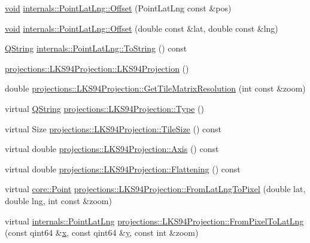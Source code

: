 \begin{DoxyCompactItemize}
\hyperlink{group___u_a_v_objects_plugin_ga444cf2ff3f0ecbe028adce838d373f5c}{void} \hyperlink{group___o_p_map_widget_ga3ad4201693b6e3add6b7ad1b9ff2e473}{internals\-::\-Point\-Lat\-Lng\-::\-Offset} (\-Point\-Lat\-Lng const \&pos)
\item 
\hyperlink{group___u_a_v_objects_plugin_ga444cf2ff3f0ecbe028adce838d373f5c}{void} \hyperlink{group___o_p_map_widget_ga41a2477cd6dbc4af991b30ddc2fc03c2}{internals\-::\-Point\-Lat\-Lng\-::\-Offset} (double const \&lat, double const \&lng)
\item 
\hyperlink{group___u_a_v_objects_plugin_gab9d252f49c333c94a72f97ce3105a32d}{\-Q\-String} \hyperlink{group___o_p_map_widget_gad6aaf34436258a8288cae1d93e13ad07}{internals\-::\-Point\-Lat\-Lng\-::\-To\-String} () const 
\item 
\hyperlink{group___o_p_map_widget_gacf511403f6a470bec942524c0e020b77}{projections\-::\-L\-K\-S94\-Projection\-::\-L\-K\-S94\-Projection} ()
\item 
double \hyperlink{group___o_p_map_widget_gade26ff9888d408a201247708930b7def}{projections\-::\-L\-K\-S94\-Projection\-::\-Get\-Tile\-Matrix\-Resolution} (int const \&zoom)
\item 
virtual \hyperlink{group___u_a_v_objects_plugin_gab9d252f49c333c94a72f97ce3105a32d}{\-Q\-String} \hyperlink{group___o_p_map_widget_gae82b8ae052c2f26ea3a4c22e5874555a}{projections\-::\-L\-K\-S94\-Projection\-::\-Type} ()
\item 
virtual \-Size \hyperlink{group___o_p_map_widget_ga86aa23efcf539805fb69e9ce24d807ec}{projections\-::\-L\-K\-S94\-Projection\-::\-Tile\-Size} () const 
\item 
virtual double \hyperlink{group___o_p_map_widget_gac4b990882512cc86ba637b3800236a67}{projections\-::\-L\-K\-S94\-Projection\-::\-Axis} () const 
\item 
virtual double \hyperlink{group___o_p_map_widget_ga16c229c3db71de0b79d22b6101b21d2d}{projections\-::\-L\-K\-S94\-Projection\-::\-Flattening} () const 
\item 
virtual \hyperlink{structcore_1_1_point}{core\-::\-Point} \hyperlink{group___o_p_map_widget_gadd46e502fee5270e191688b136e895c9}{projections\-::\-L\-K\-S94\-Projection\-::\-From\-Lat\-Lng\-To\-Pixel} (double lat, double lng, int const \&zoom)
\item 
virtual \hyperlink{structinternals_1_1_point_lat_lng}{internals\-::\-Point\-Lat\-Lng} \hyperlink{group___o_p_map_widget_gaeaf114d1ac8b52fc06bffdd1efd0ed24}{projections\-::\-L\-K\-S94\-Projection\-::\-From\-Pixel\-To\-Lat\-Lng} (const qint64 \&\hyperlink{_o_p_plots_8m_a9336ebf25087d91c818ee6e9ec29f8c1}{x}, const qint64 \&\hyperlink{_o_p_plots_8m_a2fb1c5cf58867b5bbc9a1b145a86f3a0}{y}, const int \&zoom)

\end{DoxyCompactItemize}
